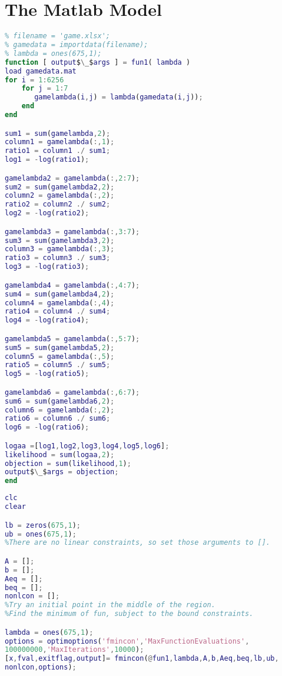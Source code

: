 \documentclass[
journal=jacsat, %
manuscript=article]{achemso}
\begin{document}
\section{The Matlab Model}
\begin{lstlisting}[language={Matlab}]
% FUN1 Summary of this function goes here
% filename = 'game.xlsx';
% gamedata = importdata(filename);
% lambda = ones(675,1);
function [ output$\_$args ] = fun1( lambda )
load gamedata.mat
for i = 1:6256
    for j = 1:7
       gamelambda(i,j) = lambda(gamedata(i,j));
    end
end

sum1 = sum(gamelambda,2);
column1 = gamelambda(:,1);
ratio1 = column1 ./ sum1;
log1 = -log(ratio1);

gamelambda2 = gamelambda(:,2:7);
sum2 = sum(gamelambda2,2);
column2 = gamelambda(:,2);
ratio2 = column2 ./ sum2;
log2 = -log(ratio2);

gamelambda3 = gamelambda(:,3:7);
sum3 = sum(gamelambda3,2);
column3 = gamelambda(:,3);
ratio3 = column3 ./ sum3;
log3 = -log(ratio3);

gamelambda4 = gamelambda(:,4:7);
sum4 = sum(gamelambda4,2);
column4 = gamelambda(:,4);
ratio4 = column4 ./ sum4;
log4 = -log(ratio4);

gamelambda5 = gamelambda(:,5:7);
sum5 = sum(gamelambda5,2);
column5 = gamelambda(:,5);
ratio5 = column5 ./ sum5;
log5 = -log(ratio5);

gamelambda6 = gamelambda(:,6:7);
sum6 = sum(gamelambda6,2);
column6 = gamelambda(:,2);
ratio6 = column6 ./ sum6;
log6 = -log(ratio6);

logaa =[log1,log2,log3,log4,log5,log6];
likelihood = sum(logaa,2);
objection = sum(likelihood,1);
output$\_$args = objection;
end
\end{lstlisting}

\begin{lstlisting}[language={Matlab}]
%Built-in Function(Optimization) 
clc
clear

lb = zeros(675,1);
ub = ones(675,1);
%There are no linear constraints, so set those arguments to [].

A = [];
b = [];
Aeq = [];
beq = [];
nonlcon = [];
%Try an initial point in the middle of the region.
%Find the minimum of fun, subject to the bound constraints.

lambda = ones(675,1);
options = optimoptions('fmincon','MaxFunctionEvaluations',
100000000,'MaxIterations',10000);
[x,fval,exitflag,output]= fmincon(@fun1,lambda,A,b,Aeq,beq,lb,ub,
nonlcon,options);

\end{lstlisting}
\end{document}
